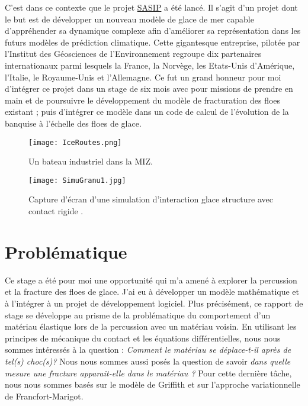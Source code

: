 C'est dans ce contexte que le projet \href{https://sasip-climate.github.io/}{SASIP} a été lancé. Il s'agit d'un projet dont le but est de développer un nouveau modèle de glace de mer capable d'appréhender sa dynamique complexe afin d'améliorer sa représentation dans les futurs modèles de prédiction climatique. Cette gigantesque entreprise, pilotée par l'Institut des Géosciences de l'Environnement regroupe dix partenaires internationaux parmi lesquels la France, la Norvège, les Etats-Unis d'Amérique, l'Italie, le Royaume-Unis et l'Allemagne. Ce fut un grand honneur pour moi d'intégrer ce projet dans un stage de six mois avec pour missions de prendre en main et de poursuivre le développement du modèle de fracturation des floes existant ; puis d'intégrer ce modèle dans un code de calcul de l’évolution de la banquise à l’échelle des floes de glace.


\begin{figure}[!h]
    \centering
    \texttt{[image: IceRoutes.png]}
    \caption{Un bateau industriel dans la MIZ.}
    \label{fig:miz}
\end{figure}

\begin{figure}[!h]
    \centering
    \texttt{[image: SimuGranu1.jpg]}
    \caption{Capture d’écran d’une simulation d’interaction glace structure avec contact rigide \parencite[p.23]{balasoiu2020halthesis}.}
    \label{fig:simugranu1}
\end{figure}







\section{Problématique}


Ce stage a été pour moi une opportunité qui m'a amené à explorer la percussion et la fracture des floes de glace. J'ai eu à développer un modèle mathématique et à l'intégrer à un projet de développement logiciel. Plus précisément, ce rapport de stage se développe au prisme de la problématique du comportement d'un matériau élastique lors de la percussion avec un matériau voisin. En utilisant les principes de mécanique du contact et les équations différentielles, nous nous sommes intéressés à la question : \emph{Comment le matériau se déplace-t-il après de tel(s) choc(s)?} Nous nous sommes aussi posés la question de savoir \emph{dans quelle mesure une fracture apparait-elle dans le matériau ?} Pour cette dernière tâche, nous nous sommes basés sur le modèle de Griffith et sur l'approche variationnelle de Francfort-Marigot.






